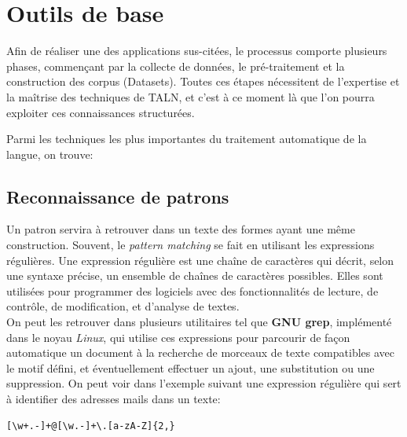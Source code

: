     
\section{Outils de base}
Afin de réaliser une des applications sus-citées, le processus comporte plusieurs phases, commençant par la collecte de données, le pré-traitement et la construction des corpus (Datasets). Toutes ces étapes nécessitent de l'expertise et la maîtrise des techniques de TALN, et c'est à ce moment là que l'on pourra exploiter ces connaissances structurées.

Parmi les techniques les plus importantes du traitement automatique de la langue, on trouve:
    \subsection{Reconnaissance de patrons}
    Un patron servira à retrouver dans un texte des formes ayant une même construction. Souvent, le \emph{pattern matching} se fait en utilisant les expressions régulières. Une expression régulière est une chaîne de caractères qui décrit, selon une syntaxe précise, un ensemble de chaînes de caractères possibles. Elles sont utilisées pour programmer des logiciels avec des fonctionnalités de lecture, de contrôle, de modification, et d'analyse de textes.\\
    On peut les retrouver dans plusieurs utilitaires tel que \textbf{GNU grep}, implémenté dans le noyau \emph{Linux}, qui utilise ces expressions pour parcourir de façon automatique un document à la recherche de morceaux de texte compatibles avec le motif défini, et éventuellement effectuer un ajout, une substitution ou une suppression.
    On peut voir dans l'exemple suivant une expression régulière qui sert à identifier des adresses mails dans un texte: 
    \begin{lstlisting}[style=code]
        [\w+.-]+@[\w.-]+\.[a-zA-Z]{2,}
    \end{lstlisting}

